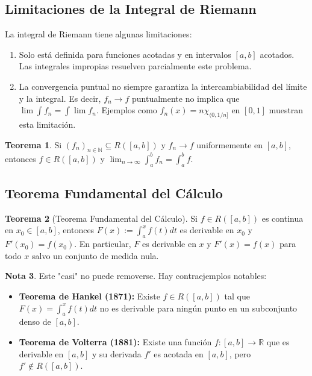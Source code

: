 \documentclass[11pt]{article}
\theoremstyle{definition} %
\newtheorem{theorem}{Teorema}[section]
\newtheorem{note}[theorem]{Nota}
\begin{document}
\subsection{Limitaciones de la Integral de Riemann}
\label{sec:limitations}
La integral de Riemann tiene algunas limitaciones:
\begin{enumerate}
    \item Solo está definida para funciones acotadas y en intervalos $[a,b]$ acotados. Las integrales impropias resuelven parcialmente este problema.
    \item La convergencia puntual no siempre garantiza la intercambiabilidad del límite y la integral. Es decir, $f_n \rightarrow f$ puntualmente no implica que $\lim \int f_n = \int \lim f_n$. Ejemplos como $f_n(x) = n\chi_{(0, 1/n]}$ en $[0,1]$ muestran esta limitación.
\end{enumerate}

\begin{theorem}
Si $(f_n)_{n \in \mathbb{N}} \subseteq R([a,b])$ y $f_n \rightarrow f$ uniformemente en $[a,b]$, entonces $f \in R([a,b])$ y $\lim_{n \rightarrow \infty} \int_{a}^{b} f_n = \int_{a}^{b} f$.
\end{theorem}

\subsection{Teorema Fundamental del Cálculo}
\label{sec:ftc}

\begin{theorem}[Teorema Fundamental del Cálculo]
Si $f \in R([a,b])$ es continua en $x_0 \in [a,b]$, entonces $F(x) := \int_{a}^{x} f(t)dt$ es derivable en $x_0$ y $F'(x_0) = f(x_0)$. En particular, $F$ es derivable en $x$ y $F'(x) = f(x)$ para todo $x$ salvo un conjunto de medida nula.
\end{theorem}

\begin{note}
Este "casi" no puede removerse. Hay contraejemplos notables:
\begin{itemize}
    \item \textbf{Teorema de Hankel (1871):} Existe $f \in R([a,b])$ tal que $F(x) = \int_{a}^{x} f(t)dt$ no es derivable para ningún punto en un subconjunto denso de $[a,b]$.
    \item \textbf{Teorema de Volterra (1881):} Existe una función $f:[a,b] \rightarrow \mathbb{R}$ que es derivable en $[a,b]$ y su derivada $f'$ es acotada en $[a,b]$, pero $f' \notin R([a,b])$.
\end{itemize}
\end{note}
\end{document}

